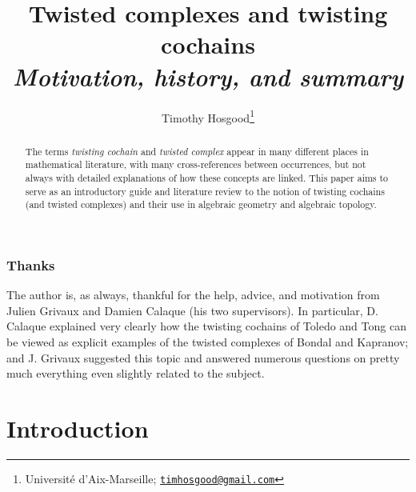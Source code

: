 \documentclass[11pt,notitlepage]{article}
\numberwithin{equation}{subsection}
\begin{document}
        

            \author{%
                Timothy Hosgood\footnote{%
                    Université d'Aix-Marseille;
                    \href{mailto:timhosgood@gmail.com}{\texttt{timhosgood@gmail.com}}%
                    }%
            }%
            \title{Twisted complexes and twisting cochains\\\Large\textit{Motivation, history, and summary}}
            \maketitle


            \begin{abstract}
                The terms \textit{twisting cochain} and \textit{twisted complex} appear in many different places in mathematical literature, with many cross-references between occurrences, but not always with detailed explanations of how these concepts are linked.
                This paper aims to serve as an introductory guide and literature review to the notion of twisting cochains (and twisted complexes) and their use in algebraic geometry and algebraic topology.
            \end{abstract}


            \vspace{-3em}
            \tableofcontents

            \subsubsection*{Thanks}
                {\small The author is, as always, thankful for the help, advice, and motivation from Julien Grivaux and Damien Calaque (his two supervisors).}
                {\small In particular, D. Calaque explained very clearly how the twisting cochains of Toledo and Tong can be viewed as explicit examples of the twisted complexes of Bondal and Kapranov; and J. Grivaux suggested this topic and answered numerous questions on pretty much everything even slightly related to the subject.}


        \section{Introduction}
\end{document}
